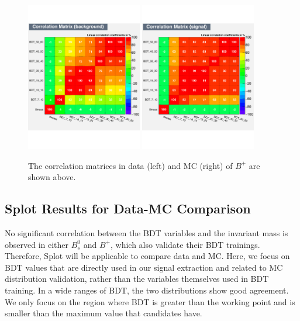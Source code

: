 \begin{figure}[h]
\begin{center}
\includegraphics[width=0.45\textwidth]{Figures/Chapter4/BPBDTCorrB.pdf}
\includegraphics[width=0.45\textwidth]{Figures/Chapter4/BPBDTCorrS.pdf}
\caption{The correlation matrices in data (left) and MC (right) of $B^+$ are shown above.}
\label{BPBDTCorr}
\end{center}
\end{figure}

\subsection{\textbf{Splot} Results for Data-MC Comparison}



No significant correlation between the BDT variables and the invariant mass is observed in either $B^0_s$ and $B^+$, which also validate their BDT trainings. Therefore, Splot will be applicable to compare data and MC. Here, we focus on BDT values that are directly used in our signal extraction and related to MC distribution validation, rather than the variables themselves used in BDT training. In a wide ranges of BDT, the two distributions show good agreement. We only focus on the region where BDT is greater than the working point and is smaller than the maximum value that candidates have.

